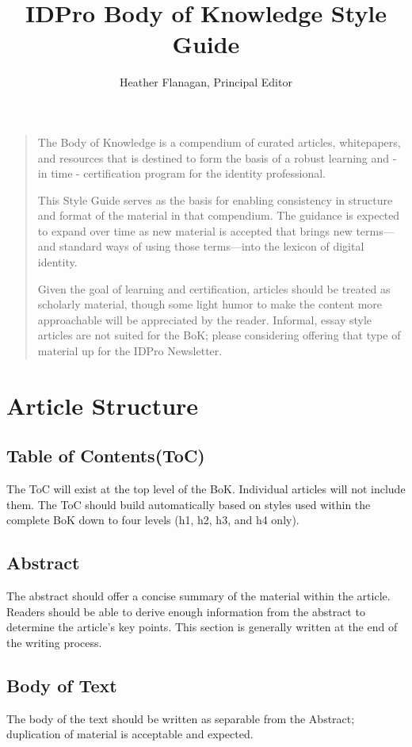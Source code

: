 \documentclass[]{article}
\title{IDPro Body of Knowledge Style Guide}
\author{Heather Flanagan, Principal Editor}
\begin{document}
\maketitle

\begin{quotation}
The Body of Knowledge is a compendium of curated articles, whitepapers, and resources that is destined to form the basis of a robust learning and - in time - certification program for the identity professional.
	
This Style Guide serves as the basis for enabling consistency in structure and format of the material in that compendium. The guidance is expected to expand over time as new material is accepted that brings new terms—and standard ways of using those terms—into the lexicon of digital identity.
	
Given the goal of learning and certification, articles should be treated as scholarly material, though some light humor to make the content more approachable will be appreciated by the reader. Informal, essay style articles are not suited for the BoK; please considering offering that type of material up for the IDPro Newsletter.
\end{quotation}


\section{Article Structure}
\subsection{Table of Contents(ToC)}
The ToC will exist at the top level of the BoK. Individual articles will not include them. The ToC should build automatically based on styles used within the complete BoK down to four levels (h1, h2, h3, and h4 only).

\subsection{Abstract}
The abstract should offer a concise summary of the material within the article. Readers should be able to derive enough information from the abstract to determine the article’s key points. This section is generally written at the end of the writing process.

\subsection{Body of Text}
The body of the text should be written as separable from the Abstract; duplication of material is acceptable and expected.
\end{document}
